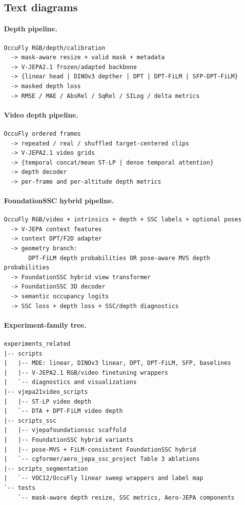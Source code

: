 \documentclass[11pt]{article}
\begin{document}
\subsection{Text diagrams}

\paragraph{Depth pipeline.}
\begin{verbatim}
OccuFly RGB/depth/calibration
  -> mask-aware resize + valid mask + metadata
  -> V-JEPA2.1 frozen/adapted backbone
  -> {linear head | DINOv3 depther | DPT | DPT-FiLM | SFP-DPT-FiLM}
  -> masked depth loss
  -> RMSE / MAE / AbsRel / SqRel / SILog / delta metrics
\end{verbatim}

\paragraph{Video depth pipeline.}
\begin{verbatim}
OccuFly ordered frames
  -> repeated / real / shuffled target-centered clips
  -> V-JEPA2.1 video grids
  -> {temporal concat/mean ST-LP | dense temporal attention}
  -> depth decoder
  -> per-frame and per-altitude depth metrics
\end{verbatim}

\paragraph{FoundationSSC hybrid pipeline.}
\begin{verbatim}
OccuFly RGB/video + intrinsics + depth + SSC labels + optional poses
  -> V-JEPA context features
  -> context DPT/F2D adapter
  -> geometry branch:
       DPT-FiLM depth probabilities OR pose-aware MVS depth probabilities
  -> FoundationSSC hybrid view transformer
  -> FoundationSSC 3D decoder
  -> semantic occupancy logits
  -> SSC loss + depth loss + SSC/depth diagnostics
\end{verbatim}

\paragraph{Experiment-family tree.}
\begin{verbatim}
experiments_related
|-- scripts
|   |-- MDE: linear, DINOv3 linear, DPT, DPT-FiLM, SFP, baselines
|   |-- V-JEPA2.1 RGB/video finetuning wrappers
|   `-- diagnostics and visualizations
|-- vjepa21video_scripts
|   |-- ST-LP video depth
|   `-- DTA + DPT-FiLM video depth
|-- scripts_ssc
|   |-- vjepafoundationssc scaffold
|   |-- FoundationSSC hybrid variants
|   |-- pose-MVS + FiLM-consistent FoundationSSC hybrid
|   `-- cgformer/aero_jepa_ssc_project Table 3 ablations
|-- scripts_segmentation
|   `-- VOC12/OccuFly linear sweep wrappers and label map
`-- tests
    `-- mask-aware depth resize, SSC metrics, Aero-JEPA components
\end{verbatim}
\end{document}
